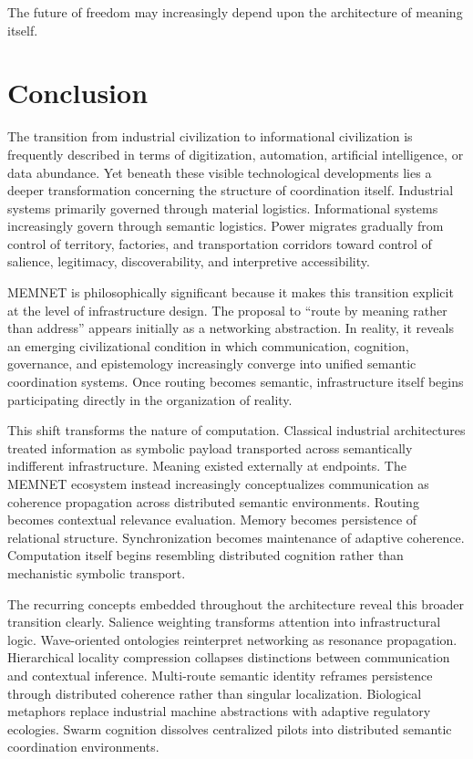 \documentclass[11pt,a4paper]{article}
\begin{document}
The future of freedom may increasingly depend upon the architecture of meaning itself.

\section{Conclusion}

The transition from industrial civilization to informational civilization is frequently described in terms of digitization, automation, artificial intelligence, or data abundance. Yet beneath these visible technological developments lies a deeper transformation concerning the structure of coordination itself. Industrial systems primarily governed through material logistics. Informational systems increasingly govern through semantic logistics. Power migrates gradually from control of territory, factories, and transportation corridors toward control of salience, legitimacy, discoverability, and interpretive accessibility.

MEMNET is philosophically significant because it makes this transition explicit at the level of infrastructure design. The proposal to ``route by meaning rather than address'' appears initially as a networking abstraction. In reality, it reveals an emerging civilizational condition in which communication, cognition, governance, and epistemology increasingly converge into unified semantic coordination systems. Once routing becomes semantic, infrastructure itself begins participating directly in the organization of reality.

This shift transforms the nature of computation. Classical industrial architectures treated information as symbolic payload transported across semantically indifferent infrastructure. Meaning existed externally at endpoints. The MEMNET ecosystem instead increasingly conceptualizes communication as coherence propagation across distributed semantic environments. Routing becomes contextual relevance evaluation. Memory becomes persistence of relational structure. Synchronization becomes maintenance of adaptive coherence. Computation itself begins resembling distributed cognition rather than mechanistic symbolic transport.

The recurring concepts embedded throughout the architecture reveal this broader transition clearly. Salience weighting transforms attention into infrastructural logic. Wave-oriented ontologies reinterpret networking as resonance propagation. Hierarchical locality compression collapses distinctions between communication and contextual inference. Multi-route semantic identity reframes persistence through distributed coherence rather than singular localization. Biological metaphors replace industrial machine abstractions with adaptive regulatory ecologies. Swarm cognition dissolves centralized pilots into distributed semantic coordination environments.
\end{document}
